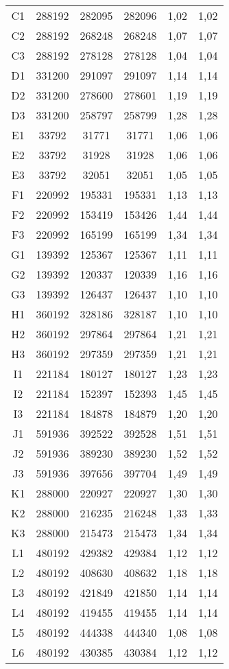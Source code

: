 \begin{center}
\begin{longtable}{cccccc}
C1    & 288192 & 282095 & 282096 & 1,02  & 1,02 \\
C2    & 288192 & 268248 & 268248 & 1,07  & 1,07 \\
C3    & 288192 & 278128 & 278128 & 1,04  & 1,04 \\
D1    & 331200 & 291097 & 291097 & 1,14  & 1,14 \\
D2    & 331200 & 278600 & 278601 & 1,19  & 1,19 \\
D3    & 331200 & 258797 & 258799 & 1,28  & 1,28 \\
E1    & 33792 & 31771 & 31771 & 1,06  & 1,06 \\
E2    & 33792 & 31928 & 31928 & 1,06  & 1,06 \\
E3    & 33792 & 32051 & 32051 & 1,05  & 1,05 \\
F1    & 220992 & 195331 & 195331 & 1,13  & 1,13 \\
F2    & 220992 & 153419 & 153426 & 1,44  & 1,44 \\
F3    & 220992 & 165199 & 165199 & 1,34  & 1,34 \\
G1    & 139392 & 125367 & 125367 & 1,11  & 1,11 \\
G2    & 139392 & 120337 & 120339 & 1,16  & 1,16 \\
G3    & 139392 & 126437 & 126437 & 1,10  & 1,10 \\
H1    & 360192 & 328186 & 328187 & 1,10  & 1,10 \\
H2    & 360192 & 297864 & 297864 & 1,21  & 1,21 \\
H3    & 360192 & 297359 & 297359 & 1,21  & 1,21 \\
I1    & 221184 & 180127 & 180127 & 1,23  & 1,23 \\
I2    & 221184 & 152397 & 152393 & 1,45  & 1,45 \\
I3    & 221184 & 184878 & 184879 & 1,20  & 1,20 \\
J1    & 591936 & 392522 & 392528 & 1,51  & 1,51 \\
J2    & 591936 & 389230 & 389230 & 1,52  & 1,52 \\
J3    & 591936 & 397656 & 397704 & 1,49  & 1,49 \\
K1    & 288000 & 220927 & 220927 & 1,30  & 1,30 \\
K2    & 288000 & 216235 & 216248 & 1,33  & 1,33 \\
K3    & 288000 & 215473 & 215473 & 1,34  & 1,34 \\
L1    & 480192 & 429382 & 429384 & 1,12  & 1,12 \\
L2    & 480192 & 408630 & 408632 & 1,18  & 1,18 \\
L3    & 480192 & 421849 & 421850 & 1,14  & 1,14 \\
L4    & 480192 & 419455 & 419455 & 1,14  & 1,14 \\
L5    & 480192 & 444338 & 444340 & 1,08  & 1,08 \\
L6    & 480192 & 430385 & 430384 & 1,12  & 1,12 \\
\end{longtable}
\end{center}


